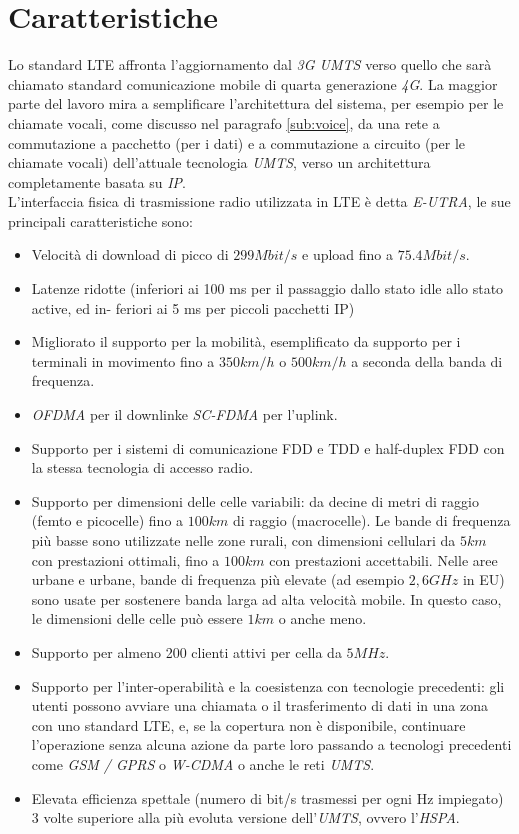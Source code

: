 \section{Caratteristiche}
\label{sub:caratteristiche}
Lo standard \ac{LTE} affronta l'aggiornamento dal \emph{3G UMTS} verso quello che sarà chiamato standard comunicazione mobile di quarta 
generazione \emph{4G}. La maggior parte del lavoro mira a semplificare l'architettura del sistema, per esempio per le 
chiamate vocali, come discusso nel paragrafo \ref{sub:voice}, da una rete a commutazione a pacchetto (per i dati) e a commutazione a 
circuito (per le chiamate vocali) dell'attuale tecnologia \emph{UMTS}, verso un architettura completamente basata su \emph{IP}. \\
L'interfaccia fisica di trasmissione radio utilizzata in \ac{LTE} è detta \emph{E-UTRA}, le sue principali caratteristiche sono:
\begin{itemize}
 \item Velocità di download di picco di $299 Mbit/s$ e upload fino a $75.4 Mbit/s$.
 \item Latenze ridotte (inferiori ai 100 ms per il passaggio dallo stato idle allo stato active, ed in-
  feriori ai 5 ms per piccoli pacchetti IP)
 \item Migliorato il supporto per la mobilità, esemplificato da supporto per i terminali in movimento fino a $350 km/h$ o $500 km/h$ 
  a seconda della banda di frequenza.
 \item \emph{OFDMA} per il downlink\footnotemark[1] e \emph{SC-FDMA} per l'uplink\footnotemark[2].
 \item Supporto per i sistemi di comunicazione \ac{FDD} e \ac{TDD} e half-duplex \ac{FDD} con la stessa tecnologia di accesso radio.
 \item Supporto per dimensioni delle celle variabili: da decine di metri di raggio (femto e picocelle) fino a $100 km$ di raggio (macrocelle).
  Le bande di frequenza più basse sono utilizzate nelle zone rurali, con dimensioni cellulari da $5 km$ con prestazioni ottimali, fino a $100 
  km$ con prestazioni accettabili. Nelle aree urbane e urbane, bande di frequenza più elevate (ad esempio $2,6 GHz$ in EU) sono usate per 
  sostenere banda larga ad alta velocità mobile. In questo caso, le dimensioni delle celle può essere $1 km$ o anche meno.
 \item Supporto per almeno 200 clienti attivi per cella da $5 MHz$.
 \item Supporto per l'inter-operabilità e la coesistenza con tecnologie precedenti: gli utenti possono avviare una chiamata o il 
  trasferimento di dati in una zona con uno standard \ac{LTE}, e, se la copertura non è disponibile, continuare l'operazione senza alcuna 
  azione da parte loro passando a tecnologi precedenti come \emph{GSM / GPRS} o \emph{W-CDMA} o anche le reti \emph{UMTS}.
 \item Elevata efficienza spettale (numero di bit/s trasmessi per ogni Hz impiegato) 3 volte superiore alla più evoluta versione 
  dell'\emph{UMTS}, ovvero l'\emph{HSPA}.
\end{itemize}

